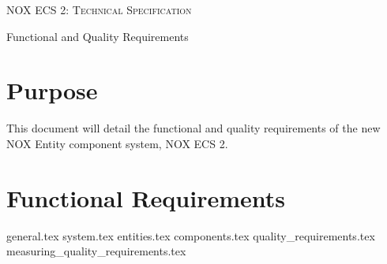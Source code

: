 \documentclass[hidelinks]{article}
\begin{document}

\begin{titlepage}
    \centering
    {\scshape\LARGE NOX ECS 2: Technical Specification \par}
    \vspace{2cm}
    {Functional and Quality Requirements \par}
    \vfill
    {\large \date{}\par}
\end{titlepage}

\pagebreak
\tableofcontents
\pagebreak

\section{Purpose}
This document will detail the functional and quality requirements of the new NOX Entity component system, NOX ECS 2.

\section{Functional Requirements}
{general.tex}
{system.tex}
{entities.tex}
{components.tex}
{quality_requirements.tex}
{measuring_quality_requirements.tex}
\end{document}
